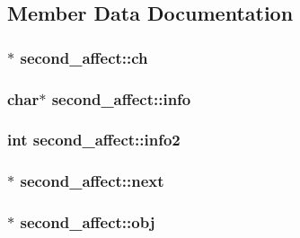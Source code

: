 \subsection{Member Data Documentation}
\hypertarget{structsecond__affect_a84480e01f74f2675eeedd316136ff2df}{
\subsubsection[{ch}]{$\ast$ second\-\_\-affect\-::ch}}\label{structsecond__affect_a84480e01f74f2675eeedd316136ff2df}
\hypertarget{structsecond__affect_ab92fc06ae75014b5bf4d66270176b2c8}{
\subsubsection[{info}]{\setlength{\rightskip}{0pt plus 5cm}char$\ast$ second\-\_\-affect\-::info}}\label{structsecond__affect_ab92fc06ae75014b5bf4d66270176b2c8}
\hypertarget{structsecond__affect_acf12f75277cf3a76670c8ed0e647c7e1}{
\subsubsection[{info2}]{\setlength{\rightskip}{0pt plus 5cm}int second\-\_\-affect\-::info2}}\label{structsecond__affect_acf12f75277cf3a76670c8ed0e647c7e1}
\hypertarget{structsecond__affect_ad173636951c2d251f5228a0eb987a267}{
\subsubsection[{next}]{$\ast$ second\-\_\-affect\-::next}}\label{structsecond__affect_ad173636951c2d251f5228a0eb987a267}
\hypertarget{structsecond__affect_a7ecf982e7b8695beeb66092f9fda651a}{
\subsubsection[{obj}]{$\ast$ second\-\_\-affect\-::obj}}\label{structsecond__affect_a7ecf982e7b8695beeb66092f9fda651a}
